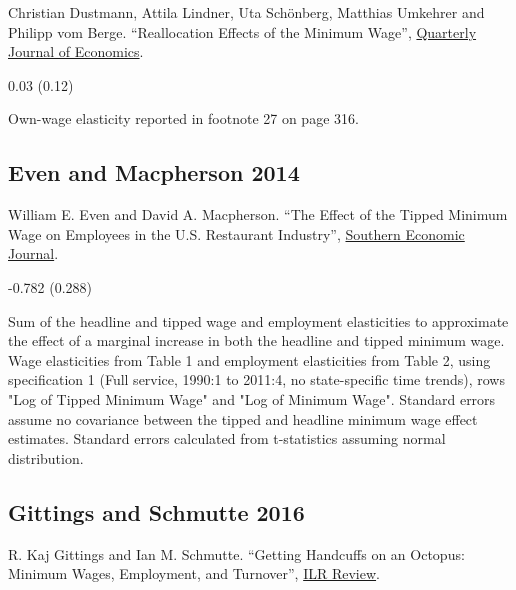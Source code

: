 \noindent Christian Dustmann, Attila Lindner, Uta Schönberg, Matthias Umkehrer and Philipp vom Berge. ``Reallocation Effects of the Minimum Wage'', \href{https://doi.org/10.1093/qje/qjab028}{Quarterly Journal of Economics}.

\vspace{0.7em}

 0.03 (0.12)

\vspace{0.7em}

 Own-wage elasticity reported in footnote 27 on page 316.

\subsection*{Even and Macpherson 2014}
\vspace{-0.7em}

\noindent William E. Even and David A. Macpherson. ``The Effect of the Tipped Minimum Wage on Employees in the U.S. Restaurant Industry'', \href{https://doi.org/10.4284/0038-4038-2012.283}{Southern Economic Journal}.

\vspace{0.7em}

 -0.782 (0.288)

\vspace{0.7em}

 Sum of the headline and tipped wage and employment elasticities to approximate the effect of a marginal increase in both the headline and tipped minimum wage. Wage elasticities from Table 1 and employment elasticities from Table 2, using specification 1 (Full service, 1990:1 to 2011:4, no state-specific time trends), rows "Log of Tipped Minimum Wage" and "Log of Minimum Wage". Standard errors assume no covariance between the tipped and headline minimum wage effect estimates. Standard errors calculated from t-statistics assuming normal distribution.

\subsection*{Gittings and Schmutte 2016}
\vspace{-0.7em}

\noindent R. Kaj Gittings and Ian M. Schmutte. ``Getting Handcuffs on an Octopus: Minimum Wages, Employment, and Turnover'', \href{https://doi.org/10.1177/0019793915623519}{ILR Review}.

